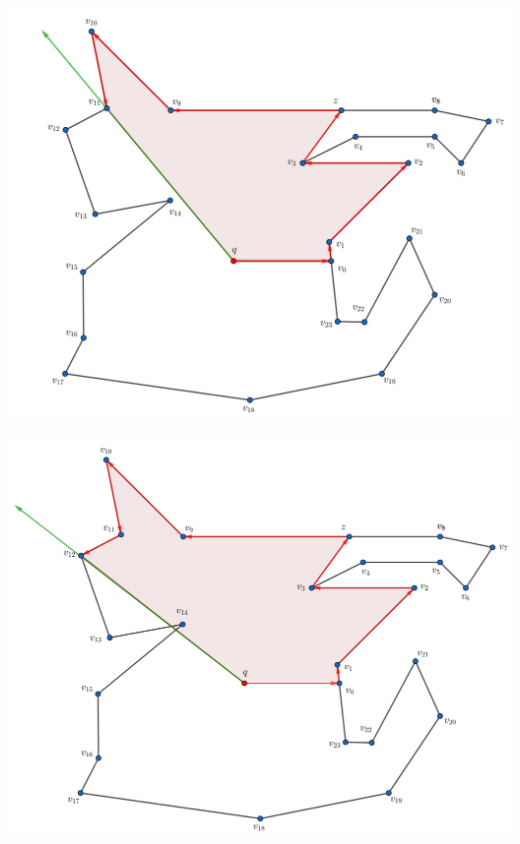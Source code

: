 \begin{frame}
  \centering \includegraphics[width=0.70 \paperwidth]{images/Ejecucion/e10.png}
\end{frame}

\begin{frame}
  \centering \includegraphics[width=0.70 \paperwidth]{images/Ejecucion/e11.png}
\end{frame}

